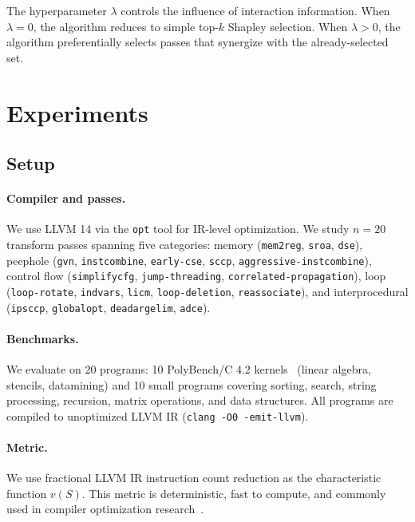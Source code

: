 \documentclass{article}
\newcommand{\coal}{S}
\newcommand{\val}{v}
\begin{document}
The hyperparameter $\lambda$ controls the influence of interaction information. When $\lambda = 0$, the algorithm reduces to simple top-$k$ Shapley selection. When $\lambda > 0$, the algorithm preferentially selects passes that synergize with the already-selected set.

\section{Experiments}
\label{sec:experiments}

\subsection{Setup}

\paragraph{Compiler and passes.} We use LLVM 14 via the \texttt{opt} tool for IR-level optimization. We study $n = 20$ transform passes spanning five categories: memory (\texttt{mem2reg}, \texttt{sroa}, \texttt{dse}), peephole (\texttt{gvn}, \texttt{instcombine}, \texttt{early-cse}, \texttt{sccp}, \texttt{aggressive-inst\-combine}), control flow (\texttt{simplifycfg}, \texttt{jump-threading}, \texttt{correlated-propagation}), loop (\texttt{loop-rotate}, \texttt{indvars}, \texttt{licm}, \texttt{loop-deletion}, \texttt{reassociate}), and inter\-procedural (\texttt{ipsccp}, \texttt{globalopt}, \texttt{deadargelim}, \texttt{adce}).

\paragraph{Benchmarks.} We evaluate on 20 programs: 10 PolyBench/C 4.2 kernels~\citep{pouchet2012polybench} (linear algebra, stencils, datamining) and 10 small programs covering sorting, search, string processing, recursion, matrix operations, and data structures. All programs are compiled to unoptimized LLVM IR (\texttt{clang -O0 -emit-llvm}).

\paragraph{Metric.} We use fractional LLVM IR instruction count reduction as the characteristic function $\val(\coal)$. This metric is deterministic, fast to compute, and commonly used in compiler optimization research~\citep{cummins2022compilergym}.
\end{document}
